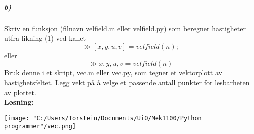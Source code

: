 \documentclass[11pt, A4paper,norsk]{article}
\begin{document}
			\subparagraph{b)}
				\begin{flushleft}
Skriv en funksjon (filnavn velfield.m eller velfield.py) som beregner hastigheter utfra likning (1) ved kallet $$\gg [x,y,u,v]=velfield(n);$$ eller $$\gg x,y,u,v=velfield(n)$$ Bruk denne i et skript, vec.m eller vec.py, som tegner et vektorplott av hastighetsfeltet. Legg vekt på å velge et passende antall punkter for lesbarheten av plottet. \\
\vspace{1mm}
\textbf{Løsning:} \\
\vspace{1mm}


\texttt{[image: "C:/Users/Torstein/Documents/UiO/Mek1100/Python programmer"/vec.png]}
				\end{flushleft}
\end{document}

